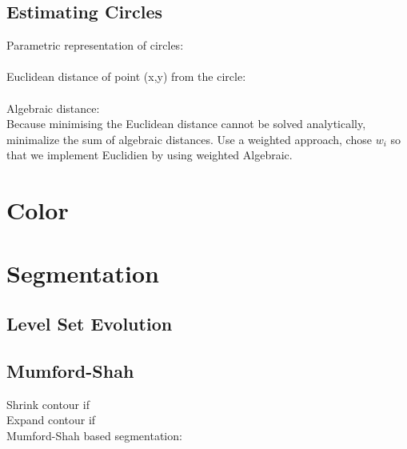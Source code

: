 \documentclass[a4paper,12pt,pdftex]{scrreprt}
\begin{document}
	\section{Estimating Circles} %
	\label{sec:estimating_circles}
	Parametric representation of circles:\\
	\\
	Euclidean distance of point (x,y) from the circle:\\
	\\
	Algebraic distance:\\
	Because minimising the Euclidean distance cannot be solved analytically, minimalize the sum of algebraic distances. Use a weighted approach, chose $w_{i}$ so that we implement Euclidien by using weighted Algebraic.

	\chapter{Color} %
	\label{cha:color}

	\chapter{Segmentation} %
	\label{cha:segmentation}
	
	\section{Level Set Evolution} %
	\label{sec:level_set_evolution}

	\section{Mumford-Shah} %
	\label{sec:mumford_shah}
	Shrink contour if \\
	Expand contour if \\
	Mumford-Shah based segmentation:\\


\end{document}
